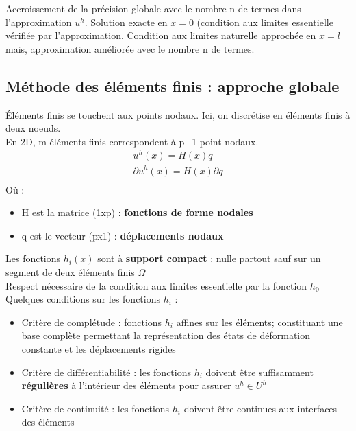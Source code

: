\documentclass[../main.tex]{subfiles}
\begin{document}
Accroissement de la précision globale avec le nombre n de termes dans l'approximation $u^h$. Solution exacte en $x=0$ (condition aux limites essentielle vérifiée par l'approximation. Condition aux limites naturelle approchée en $x=l$ mais, approximation améliorée avec le nombre n de termes.\\

\subsection{Méthode des éléments finis : approche globale}
Éléments finis se touchent aux points nodaux. Ici, on discrétise en éléments finis à deux noeuds. \\
En 2D, m éléments finis correspondent à p+1 point nodaux.\\

\begin{equation}
    \begin{gathered}
        u^h(x) = H(x) q\\
        \partial u^h(x) = H(x) \partial q\\
    \end{gathered}
\end{equation}
Où : \begin{itemize}
    \item H est la matrice (1xp) : \textbf{fonctions de forme nodales}\\
    \item q est le vecteur (px1) : \textbf{déplacements nodaux}\\
\end{itemize}

Les fonctions $h_i(x)$ sont à \textbf{support compact} : nulle partout sauf sur un segment de deux éléments finis $\Omega$\\

\warning Respect nécessaire de la condition aux limites essentielle par la fonction $h_0$\\

Quelques conditions sur les fonctions $h_i$ : \begin{itemize}
    \item Critère de complétude : fonctions $h_i$ affines sur les éléments; constituant une base complète permettant la représentation des états de déformation constante et les déplacements rigides\\
    \item Critère de différentiabilité : les fonctions $h_i$ doivent être suffisamment \textbf{régulières} à l'intérieur des éléments pour assurer $u^h \in U^h$\\
    \item Critère de continuité : les fonctions $h_i$ doivent être continues aux interfaces des éléments\\
\end{itemize}
\end{document}
